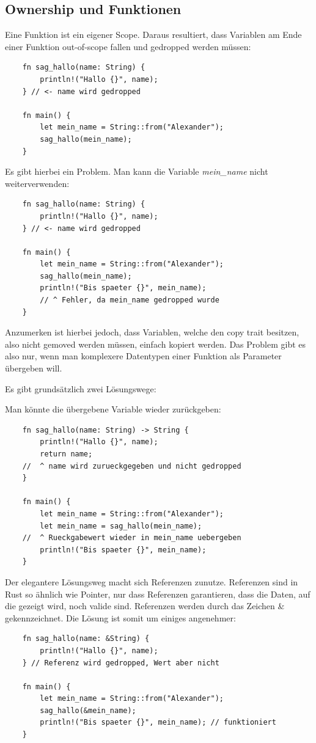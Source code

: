 \subsection{Ownership und Funktionen}
Eine Funktion ist ein eigener Scope. Daraus resultiert, dass Variablen am Ende einer Funktion out-of-scope fallen und gedropped werden müssen:
\begin{lstlisting}
    fn sag_hallo(name: String) {
        println!("Hallo {}", name);
    } // <- name wird gedropped

    fn main() {
        let mein_name = String::from("Alexander");
        sag_hallo(mein_name);
    }
\end{lstlisting}
Es gibt hierbei ein Problem. Man kann die Variable \textit{mein\_name} nicht weiterverwenden:
\begin{lstlisting}
    fn sag_hallo(name: String) {
        println!("Hallo {}", name);
    } // <- name wird gedropped

    fn main() {
        let mein_name = String::from("Alexander");
        sag_hallo(mein_name);
        println!("Bis spaeter {}", mein_name);
        // ^ Fehler, da mein_name gedropped wurde
    }
\end{lstlisting}
Anzumerken ist hierbei jedoch, dass Variablen, welche den copy trait besitzen, also nicht gemoved werden müssen, einfach kopiert werden. Das
Problem gibt es also nur, wenn man komplexere Datentypen einer Funktion als Parameter übergeben will.

Es gibt grundsätzlich zwei Lösungswege:

Man könnte die übergebene Variable wieder zurückgeben:
\begin{lstlisting}
    fn sag_hallo(name: String) -> String {
        println!("Hallo {}", name);
        return name; 
    //  ^ name wird zurueckgegeben und nicht gedropped
    }

    fn main() {
        let mein_name = String::from("Alexander");
        let mein_name = sag_hallo(mein_name);
    //  ^ Rueckgabewert wieder in mein_name uebergeben
        println!("Bis spaeter {}", mein_name);
    }
\end{lstlisting}

Der elegantere Lösungsweg macht sich Referenzen zunutze. Referenzen sind in Rust so ähnlich wie Pointer, nur dass Referenzen
garantieren, dass die Daten, auf die gezeigt wird, noch valide sind. Referenzen werden durch das Zeichen \& gekennzeichnet. Die Lösung
ist somit um einiges angenehmer:
\begin{lstlisting}
    fn sag_hallo(name: &String) {
        println!("Hallo {}", name);
    } // Referenz wird gedropped, Wert aber nicht

    fn main() {
        let mein_name = String::from("Alexander");
        sag_hallo(&mein_name);
        println!("Bis spaeter {}", mein_name); // funktioniert
    }
\end{lstlisting}

